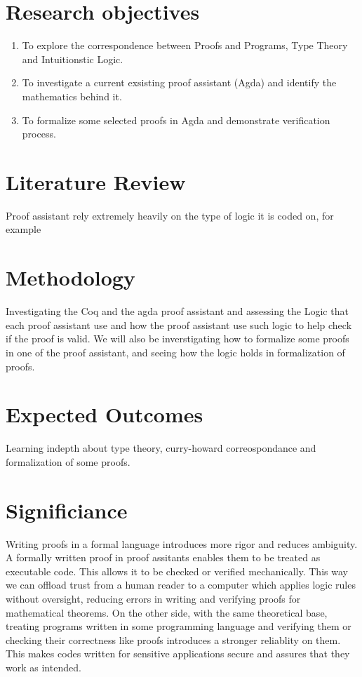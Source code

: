 \documentclass{article}
\begin{document}
\section{Research objectives}
\begin{enumerate}
    \item To explore the correspondence between Proofs and Programs, Type Theory and Intuitionstic Logic.
    \item To investigate a current exsisting proof assistant (Agda) and identify the mathematics behind it.
    \item To formalize some selected proofs in Agda and demonstrate verification process.
\end{enumerate}
\section{Literature Review}
Proof assistant rely extremely heavily on the type of logic it is coded on, for example 
\section{Methodology}
Investigating the  Coq and the agda proof assistant and assessing the Logic that each proof assistant use and how the proof assistant use such logic to help check if the proof is valid.
We will also be inverstigating how to formalize some proofs in one of the proof assistant, and seeing how the logic holds in formalization of proofs. 

\section{Expected Outcomes}
Learning indepth about type theory, curry-howard correospondance and formalization of some proofs.  
\section{Significiance}
Writing proofs in a formal language introduces more rigor and reduces ambiguity. A formally written proof in proof assitants enables them to be treated as executable code. This allows it to be checked or verified mechanically. This way we can offload trust from a human reader to a computer which applies logic rules without oversight, reducing errors in writing and verifying proofs for mathematical theorems.
On the other side, with the same theoretical base, treating programs written in some programming language and verifying them or checking their correctness like proofs introduces a stronger reliablity on them. This makes codes written for sensitive applications secure and assures that they work as intended.
\end{document}
